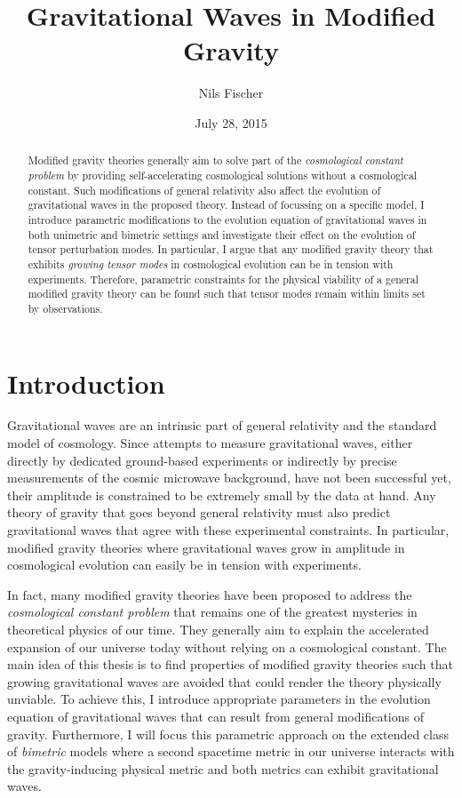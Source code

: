 \documentclass[12pt,parskip=half]{scrreprt}
\title{Gravitational Waves in Modified Gravity}
\author{Nils Fischer}
\date{July 28, 2015}
\begin{document}


\begin{abstract}
	Modified gravity theories generally aim to solve part of the \emph{cosmological constant problem} by providing self-accelerating cosmological solutions without a cosmological constant. Such modifications of general relativity also affect the evolution of gravitational waves in the proposed theory. Instead of focussing on a specific model, I introduce parametric modifications to the evolution equation of gravitational waves in both unimetric and bimetric settings and investigate their effect on the evolution of tensor perturbation modes. In particular, I argue that any modified gravity theory that exhibits \emph{growing tensor modes} in cosmological evolution can be in tension with experiments. Therefore, parametric constraints for the physical viability of a general modified gravity theory can be found such that tensor modes remain within limits set by observations.
\end{abstract}


\tableofcontents


\chapter{Introduction}\label{ch:intro}

Gravitational waves are an intrinsic part of general relativity and the standard model of cosmology. Since attempts to measure gravitational waves, either directly by dedicated ground-based experiments or indirectly by precise measurements of the cosmic microwave background, have not been successful yet, their amplitude is constrained to be extremely small by the data at hand. Any theory of gravity that goes beyond general relativity must also predict gravitational waves that agree with these experimental constraints. In particular, modified gravity theories where gravitational waves grow in amplitude in cosmological evolution can easily be in tension with experiments.

In fact, many modified gravity theories have been proposed to address the \emph{cosmological constant problem} that remains one of the greatest mysteries in theoretical physics of our time. They generally aim to explain the accelerated expansion of our universe today without relying on a cosmological constant. The main idea of this thesis is to find properties of modified gravity theories such that growing gravitational waves are avoided that could render the theory physically unviable. To achieve this, I introduce appropriate parameters in the evolution equation of gravitational waves that can result from general modifications of gravity. Furthermore, I will focus this parametric approach on the extended class of \emph{bimetric} models where a second spacetime metric in our universe interacts with the gravity-inducing physical metric and both metrics can exhibit gravitational waves.
\end{document}
